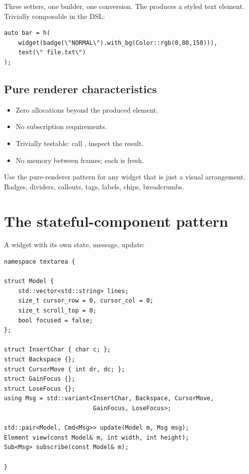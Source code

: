 Three setters, one builder, one conversion. The 
produces a styled text element. Trivially composable in the DSL:

\begin{lstlisting}
auto bar = h(
    widget(badge(\"NORMAL\").with_bg(Color::rgb(0,80,150))),
    text(\" file.txt\")
);
\end{lstlisting}

\subsection*{Pure renderer characteristics}

\begin{itemize}[leftmargin=*]
  \item Zero allocations beyond the produced element.
  \item No subscription requirements.
  \item Trivially testable: call , inspect the result.
  \item No memory between frames; each  is fresh.
\end{itemize}

Use the pure-renderer pattern for any widget that is just a
visual arrangement. Badges, dividers, callouts, tags, labels,
chips, breadcrumbs.

\section{The stateful-component pattern}

A widget with its own state, message, update:

\begin{lstlisting}
namespace textarea {

struct Model {
    std::vector<std::string> lines;
    size_t cursor_row = 0, cursor_col = 0;
    size_t scroll_top = 0;
    bool focused = false;
};

struct InsertChar { char c; };
struct Backspace {};
struct CursorMove { int dr, dc; };
struct GainFocus {};
struct LoseFocus {};
using Msg = std::variant<InsertChar, Backspace, CursorMove,
                         GainFocus, LoseFocus>;

std::pair<Model, Cmd<Msg>> update(Model m, Msg msg);
Element view(const Model& m, int width, int height);
Sub<Msg> subscribe(const Model& m);

}
\end{lstlisting}

